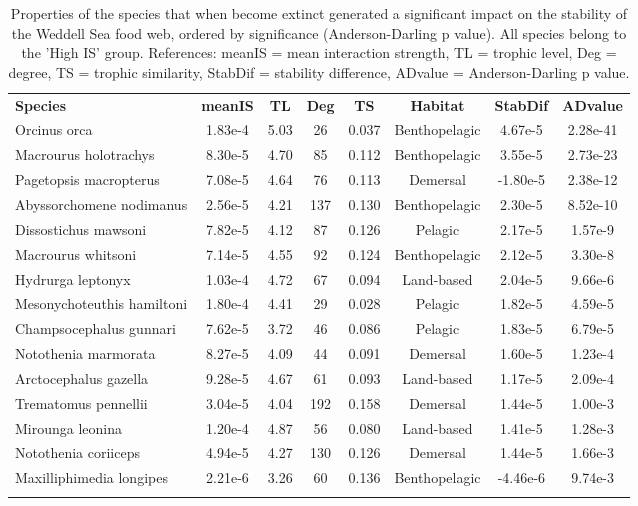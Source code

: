 \documentclass[gc, manuscript]{copernicus}
\begin{document}
\begin{table}[t]
\caption{Properties of the species that when become extinct generated a significant impact on the stability of the Weddell Sea food web, ordered by significance (Anderson-Darling p value). All species belong to the 'High IS' group.  References: meanIS = mean interaction strength, TL = trophic level, Deg = degree, TS = trophic similarity, StabDif = stability difference, ADvalue = Anderson-Darling p value.}
\begin{tabular}{l c c c c c c c}
\tophline

\textbf{Species} & \textbf{meanIS} & \textbf{TL} & \textbf{Deg} & \textbf{TS} & \textbf{Habitat} & \textbf{StabDif} & \textbf{ADvalue}\\
\middlehline
Orcinus orca & 1.83e-4 & 5.03 & 26 & 0.037 & Benthopelagic & 4.67e-5 & 2.28e-41 \\
\middlehline
Macrourus holotrachys & 8.30e-5 & 4.70 & 85 & 0.112 & Benthopelagic & 3.55e-5 & 2.73e-23 \\
\middlehline
Pagetopsis macropterus & 7.08e-5 & 4.64 & 76 & 0.113 & Demersal & -1.80e-5 & 2.38e-12 \\
\middlehline
Abyssorchomene nodimanus & 2.56e-5 & 4.21 & 137 & 0.130 & Benthopelagic & 2.30e-5 & 8.52e-10 \\
\middlehline
Dissostichus mawsoni & 7.82e-5 & 4.12 & 87 & 0.126 & Pelagic & 2.17e-5 & 1.57e-9 \\
\middlehline
Macrourus whitsoni & 7.14e-5 & 4.55 & 92 & 0.124 & Benthopelagic & 2.12e-5 & 3.30e-8 \\
\middlehline
Hydrurga leptonyx & 1.03e-4 & 4.72 & 67 & 0.094 & Land-based & 2.04e-5 & 9.66e-6 \\
\middlehline
Mesonychoteuthis hamiltoni & 1.80e-4 & 4.41 & 29 & 0.028 & Pelagic & 1.82e-5 & 4.59e-5 \\
\middlehline
Champsocephalus gunnari & 7.62e-5 & 3.72 & 46 & 0.086 & Pelagic & 1.83e-5 & 6.79e-5 \\
\middlehline
Notothenia marmorata & 8.27e-5 & 4.09 & 44 & 0.091 & Demersal & 1.60e-5 & 1.23e-4 \\
\middlehline
Arctocephalus gazella & 9.28e-5 & 4.67 & 61 & 0.093 & Land-based & 1.17e-5 & 2.09e-4 \\
\middlehline
Trematomus pennellii & 3.04e-5 & 4.04 & 192 & 0.158 & Demersal & 1.44e-5 & 1.00e-3 \\
\middlehline
Mirounga leonina & 1.20e-4 & 4.87 & 56 & 0.080 & Land-based & 1.41e-5 & 1.28e-3 \\
\middlehline
Notothenia coriiceps & 4.94e-5 & 4.27 & 130 & 0.126 & Demersal & 1.44e-5 & 1.66e-3 \\
\middlehline
Maxilliphimedia longipes & 2.21e-6 & 3.26 & 60 & 0.136 & Benthopelagic & -4.46e-6 & 9.74e-3 \\

\bottomhline
\end{tabular}
\end{table}
\end{document}
